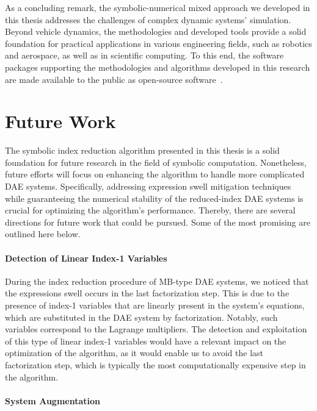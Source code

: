 As a concluding remark, the symbolic-numerical mixed approach we developed in this thesis addresses the challenges of complex dynamic systems' simulation. Beyond vehicle dynamics, the methodologies and developed tools provide a solid foundation for practical applications in various engineering fields, such as robotics and aerospace, as well as in scientific computing. To this end, the software packages supporting the methodologies and algorithms developed in this research are made available to the public as open-source software~\cite{acme, enve, lime, limerickey, lem, last, indigo, trussme}.

\section{Future Work}
\label{chap6:sec:future_work}

The symbolic index reduction algorithm presented in this thesis is a solid foundation for future research in the field of symbolic computation. Nonetheless, future efforts will focus on enhancing the algorithm to handle more complicated \ac{DAE} systems. Specifically, addressing expression swell mitigation techniques while guaranteeing the numerical stability of the reduced-index \ac{DAE} systems is crucial for optimizing the algorithm's performance. Thereby, there are several directions for future work that could be pursued. Some of the most promising are outlined here below.

\paragraph{Detection of Linear Index-1 Variables}

During the index reduction procedure of \ac{MB}-type \ac{DAE} systems, we noticed that the expressions swell occurs in the last factorization step. This is due to the presence of index-1 variables that are linearly present in the system's equations, which are substituted in the \ac{DAE} system by factorization. Notably, such variables correspond to the Lagrange multipliers. The detection and exploitation of this type of linear index-1 variables would have a relevant impact on the optimization of the algorithm, as it would enable us to avoid the last factorization step, which is typically the most computationally expensive step in the algorithm.

\paragraph{System Augmentation}


